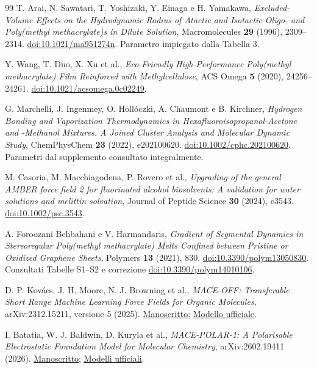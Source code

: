 \documentclass[11pt,reqno]{amsart}
\numberwithin{equation}{section}
\begin{document}
\begin{thebibliography}{99}
T. Arai, N. Sawatari, T. Yoshizaki, Y. Einaga e H. Yamakawa,
\emph{Excluded-Volume Effects on the Hydrodynamic Radius of Atactic and
Isotactic Oligo- and Poly(methyl methacrylate)s in Dilute Solution},
Macromolecules \textbf{29} (1996), 2309--2314.
\href{https://doi.org/10.1021/ma951274n}{doi:10.1021/ma951274n}.
Parametro impiegato dalla Tabella 3.

Y. Wang, T. Duo, X. Xu et al., \emph{Eco-Friendly High-Performance
Poly(methyl methacrylate) Film Reinforced with Methylcellulose},
ACS Omega \textbf{5} (2020), 24256--24261.
\href{https://doi.org/10.1021/acsomega.0c02249}{doi:10.1021/acsomega.0c02249}.

G. Marchelli, J. Ingenmey, O. Holl\'oczki, A. Chaumont e B. Kirchner,
\emph{Hydrogen Bonding and Vaporization Thermodynamics in
Hexafluoroisopropanol-Acetone and -Methanol Mixtures.
A Joined Cluster Analysis and Molecular Dynamic Study},
ChemPhysChem \textbf{23} (2022), e202100620.
\href{https://doi.org/10.1002/cphc.202100620}{doi:10.1002/cphc.202100620}.
Parametri dal supplemento consultato integralmente.

M. Casoria, M. Macchiagodena, P. Rovero et al.,
\emph{Upgrading of the general AMBER force field 2 for fluorinated
alcohol biosolvents: A validation for water solutions and melittin solvation},
Journal of Peptide Science \textbf{30} (2024), e3543.
\href{https://doi.org/10.1002/psc.3543}{doi:10.1002/psc.3543}.

A. Foroozani Behbahani e V. Harmandaris,
\emph{Gradient of Segmental Dynamics in Stereoregular Poly(methyl
methacrylate) Melts Confined between Pristine or Oxidized Graphene Sheets},
Polymers \textbf{13} (2021), 830.
\href{https://doi.org/10.3390/polym13050830}{doi:10.3390/polym13050830}.
Consultati Tabelle S1--S2 e correzione
\href{https://doi.org/10.3390/polym14010106}{doi:10.3390/polym14010106}.

D. P. Kov\'acs, J. H. Moore, N. J. Browning et al.,
\emph{MACE-OFF: Transferable Short Range Machine Learning Force Fields
for Organic Molecules}, arXiv:2312.15211, versione 5 (2025).
\href{https://arxiv.org/abs/2312.15211v5}{Manoscritto};
\href{https://github.com/ACEsuit/mace-off}{Modello ufficiale}.

I. Batatia, W. J. Baldwin, D. Kuryla et al.,
\emph{MACE-POLAR-1: A Polarisable Electrostatic Foundation Model
for Molecular Chemistry}, arXiv:2602.19411 (2026).
\href{https://arxiv.org/abs/2602.19411}{Manoscritto};
\href{https://github.com/ACEsuit/mace-foundations/releases/tag/mace_polar_1}{Modelli ufficiali}.


\end{thebibliography}
\end{document}
